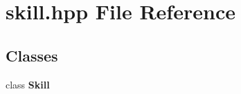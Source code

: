\section{skill.hpp File Reference}
\label{skill_8hpp}
\subsection*{Classes}
\begin{CompactItemize}
\item 
class {\bf Skill}
\end{CompactItemize}
